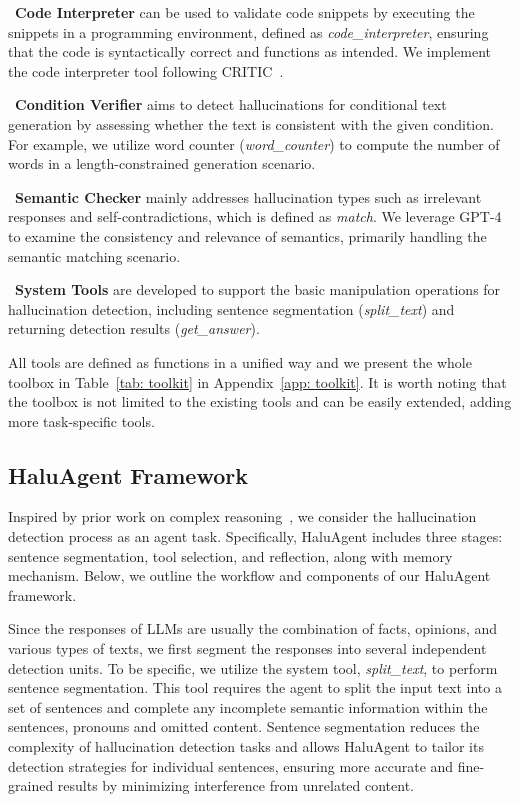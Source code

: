 \textbullet~\textbf{Code Interpreter} can be used to validate code snippets by executing the snippets in a programming environment, defined as \emph{code\_interpreter}, ensuring that the code is syntactically correct and functions as intended. 
We implement the code interpreter tool following CRITIC~\cite{gou2024critic}.

\textbullet~\textbf{Condition Verifier} aims to detect hallucinations for conditional text generation by assessing whether the text is consistent with the given condition. For example, we utilize word counter (\emph{word\_counter}) to compute the number of words in a length-constrained generation scenario. 


\textbullet~\textbf{Semantic Checker} mainly addresses hallucination types such as irrelevant responses and self-contradictions, which is defined as \emph{match}. 
We leverage GPT-4 to examine the consistency and relevance of semantics, primarily handling the semantic matching scenario. 

\textbullet~\textbf{System Tools} are developed to support the basic manipulation operations for hallucination detection, including sentence segmentation (\emph{split\_text}) and returning detection results (\emph{get\_answer}).

All tools are defined as functions in a unified way and we present the whole toolbox in Table~\ref{tab: toolkit} in Appendix~\ref{app: toolkit}. It is worth noting that the toolbox is not limited to the existing tools and can be easily extended, \eg adding more task-specific tools.


\subsection{HaluAgent Framework}
\label{haluagent framework}

Inspired by prior work on complex reasoning~\cite{KGAgent}, we consider the hallucination detection process as an agent task. 
Specifically, HaluAgent includes three stages: sentence segmentation, tool selection, and reflection, along with memory mechanism. Below, we outline the workflow and components of our HaluAgent framework.

Since the responses of LLMs are usually the combination of facts, opinions, and various types of texts, we first segment the responses into several independent detection units. To be specific, we utilize the system tool, \textit{split\_text}, to perform sentence segmentation. This tool requires the agent to split the input text into a set of sentences and complete any incomplete semantic information within the sentences, \eg pronouns and omitted content.
Sentence segmentation reduces the complexity of hallucination detection tasks and allows HaluAgent to tailor its detection strategies for individual sentences, ensuring more accurate and fine-grained results by minimizing interference from unrelated content.


